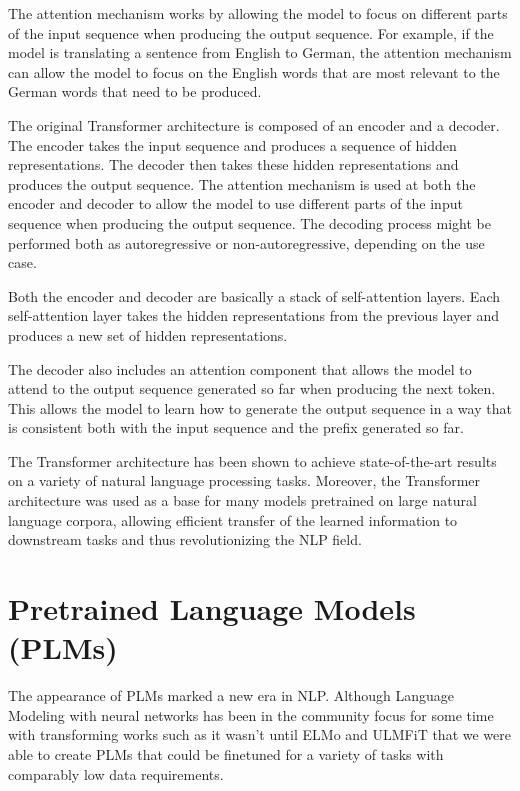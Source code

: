 The attention mechanism works by allowing the model to focus on different parts of the input sequence when producing the output sequence.
For example, if the model is translating a sentence from English to German, the attention mechanism can allow the model to focus on the English words that are most relevant to the German words that need to be produced.

The original Transformer architecture is composed of an encoder and a decoder.
The encoder takes the input sequence and produces a sequence of hidden representations.
The decoder then takes these hidden representations and produces the output sequence.
The attention mechanism is used at both the encoder and decoder to allow the model to use different parts of the input sequence when producing the output sequence.
The decoding process might be performed both as autoregressive or non-autoregressive, depending on the use case.

Both the encoder and decoder are basically a stack of self-attention layers.
Each self-attention layer takes the hidden representations from the previous layer and produces a new set of hidden representations.

The decoder also includes an attention component that allows the model to attend to the output sequence generated so far when producing the next token.
This allows the model to learn how to generate the output sequence in a way that is consistent both with the input sequence and the prefix generated so far.

The Transformer architecture has been shown to achieve state-of-the-art results on a variety of natural language processing tasks. 
Moreover, the Transformer architecture was used as a base for many models pretrained on large natural language corpora, allowing efficient transfer of the learned information to downstream tasks and thus revolutionizing the NLP field.

\section{Pretrained Language Models (PLMs)}
\label{background:plms}
The appearance of PLMs marked a new era in NLP.
Although Language Modeling with neural networks has been in the community focus for some time with transforming works such as  \citet{mikolov2010recurrent,mikolov2013distributed} it wasn't until ELMo \cite{peters-etal-2018-deep} and ULMFiT \cite{howard-ruder-2018-universal}that we were able to create PLMs that could be finetuned for a variety of tasks with comparably low data requirements.

